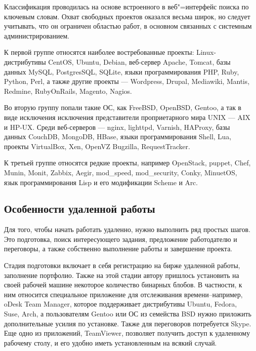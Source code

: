 \documentclass[10pt, a5paper]{article}
\begin{document}
Классификация проводилась на основе встроенного в веб"=интерфейс поиска по ключевым словам. Охват свободных проектов оказался весьма широк, но следует учитывать, что он ограничен областью работ, в основном связанных с системным администрированием.

К первой группе относятся наиболее востребованные проекты: Linux-дистрибутивы CentOS, Ubuntu, Debian, веб-сервер Apache, Tomcat, базы данных MySQL, PostgresSQL, SQLite, языки программирования PHP, Ruby, Python, Perl, а также другие проекты --- Wordpress, Drupal, Mediawiki, Mantis, Redmine, \linebreak RubyOnRails, Magento, Nagios.

Во вторую группу попали такие ОС, как FreeBSD, OpenBSD,  Gentoo, а так в виде исключения исключения представители проприетарного мира UNIX --- AIX и HP-UX. Среди веб-серверов --- nginx, lighttpd, Varnish, HAProxy, базы данных CouchDB, MongoDB, HBase, языки программирования Shell, Lua, проекты VirtualBox, Xen, \linebreak OpenVZ Bugzilla, RequestTracker.

К третьей группе относятся редкие проекты, например \linebreak OpenStack, puppet, Chef, Munin, Monit, Zabbix, Aegir, mod\_speed, mod\_security, Conky, MinuetOS,  язык программирования Lisp и его модификации Scheme и Arc.

\subsection*{Особенности удаленной работы}

Для того, чтобы  начать работать удаленно, нужно выполнить ряд простых шагов. Это подготовка, поиск интересующего задания, предложение работодателю и переговоры, а также собственно выполнение работы и завершение проекта.

Стадия подготовки включает в себя регистрацию на бирже удаленной работы, заполнение портфолио. Также на этой стадии автору пришлось установить на своей рабочей машине некоторое количество бинарных блобов. В частности, к ним относится  специальное  приложение для отслеживания времени--например, oDesk Team Manager, которое поддерживает дистрибутивы Ubuntu, Fedora, Suse, Arch, а пользователям Gentoo или ОС из семейства BSD нужно приложить дополнительные усилия по установке. Также для переговоров потребуется Skype. Еще одно из приложений, TeamViewer, позволяет получить доступ к удаленному рабочему столу, и его удобно иметь установленным на всякий случай.
\end{document}
